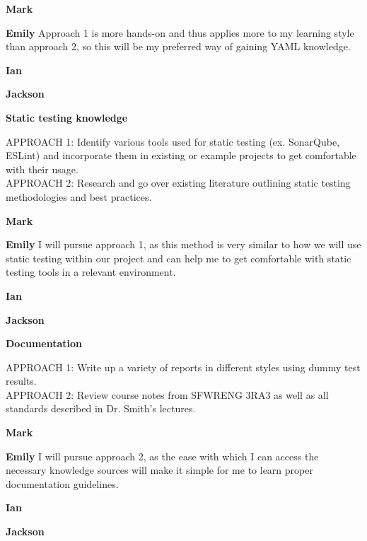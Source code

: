 \documentclass[12pt, titlepage]{article}
\begin{document}
\begin{enumerate}[leftmargin=*]
  \textbf{Mark}

  \textbf{Emily} Approach 1 is more hands-on and thus applies more to my learning style than approach 2, so this will be my preferred way of gaining YAML knowledge.

  \textbf{Ian}

  \textbf{Jackson}

  \vspace{10pt}
  \textbf{Static testing knowledge}

  APPROACH 1: Identify various tools used for static testing (ex. SonarQube, ESLint) and incorporate them in existing or example projects to get comfortable with their usage. \\
  APPROACH 2: Research and go over existing literature outlining static testing methodologies and best practices.

  \textbf{Mark}

  \textbf{Emily} I will pursue approach 1, as this method is very similar to how we will use static testing within our project and can help me to get comfortable with static testing tools in a relevant environment.

  \textbf{Ian}

  \textbf{Jackson}

  \vspace{10pt}
  \textbf{Documentation}

  APPROACH 1: Write up a variety of reports in different styles using dummy test results. \\
  APPROACH 2: Review course notes from SFWRENG 3RA3 as well as all standards described in Dr. Smith’s lectures.

  \textbf{Mark}

  \textbf{Emily} I will pursue approach 2, as the ease with which I can access the necessary knowledge sources will make it simple for me to learn proper documentation guidelines.

  \textbf{Ian}

  \textbf{Jackson}

\end{enumerate}
\end{document}
